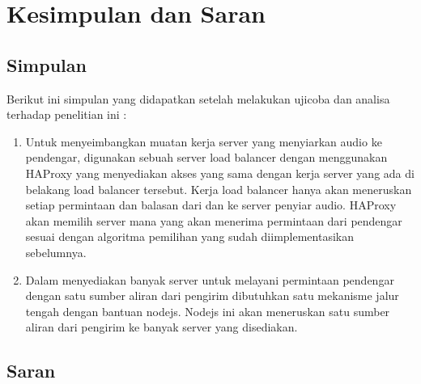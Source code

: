 \chapter{Kesimpulan dan Saran}

\section{Simpulan}
Berikut ini simpulan yang didapatkan setelah melakukan ujicoba dan analisa terhadap penelitian ini :

\begin{enumerate}
	\item Untuk menyeimbangkan muatan kerja server yang menyiarkan audio ke pendengar, digunakan sebuah server load balancer dengan menggunakan HAProxy yang menyediakan akses yang sama dengan kerja server yang ada di belakang load balancer tersebut. Kerja load balancer hanya akan meneruskan setiap permintaan dan balasan dari dan ke server penyiar audio. HAProxy akan memilih server mana yang akan menerima permintaan dari pendengar sesuai dengan algoritma pemilihan yang sudah diimplementasikan sebelumnya.
	
	\item Dalam menyediakan banyak server untuk melayani permintaan pendengar dengan satu sumber aliran dari pengirim dibutuhkan satu mekanisme jalur tengah dengan bantuan nodejs. Nodejs ini akan meneruskan satu sumber aliran dari pengirim ke banyak server yang disediakan. 
	
\end{enumerate}


\section{Saran}


